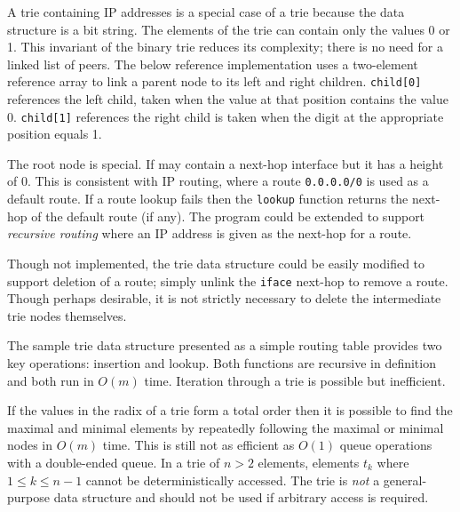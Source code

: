 \documentclass{book}
\begin{document}
A trie containing IP addresses is a special case of a trie because the data structure is a bit string. The elements of the trie can contain only the values 0 or 1. This invariant of the binary trie reduces its complexity; there is no need for a linked list of peers. The below reference implementation uses a two-element reference array to link a parent node to its left and right children. \texttt{child[0]} references the left child, taken when the value at that position contains the value 0. \texttt{child[1]} references the right child is taken when the digit at the appropriate position equals 1.

The root node is special. If may contain a next-hop interface but it has a height of 0. This is consistent with IP routing, where a route \texttt{0.0.0.0/0} is used as a default route. If a route lookup fails then the \texttt{lookup} function returns the next-hop of the default route (if any). The program could be extended to support \textit{recursive routing} where an IP address is given as the next-hop for a route.

Though not implemented, the trie data structure could be easily modified to support deletion of a route; simply unlink the \texttt{iface} next-hop to remove a route. Though perhaps desirable, it is not strictly necessary to delete the intermediate trie nodes themselves.

The sample trie data structure presented as a simple routing table provides two key operations: insertion and lookup. Both functions are recursive in definition and both run in $O(m)$ time. Iteration through a trie is possible but inefficient.

If the values in the radix of a trie form a total order then it is possible to find the maximal and minimal elements by repeatedly following the maximal or minimal nodes in $O(m)$ time. This is still not as efficient as $O(1)$ queue operations with a double-ended queue. In a trie of $n>2$ elements, elements $t_k$ where $1 \le k \le n-1$ cannot be deterministically accessed. The trie is \textit{not} a general-purpose data structure and should not be used if arbitrary access is required.
\end{document}
